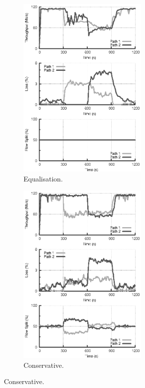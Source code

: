 \begin{figure}
    \begin{subfigure}[b]{.5\linewidth}
        \centering
        \includegraphics[width=2.5in]{figures/cate/two/equal}
        \caption{Equalisation.}\label{fig:twoequal}
    \end{subfigure}%
    \begin{subfigure}[b]{.5\linewidth}
        \centering
        \includegraphics[width=2.5in]{figures/cate/two/cons}
        \caption{Conservative.}\label{fig:twocons}
    \end{subfigure}%

    \vspace{10mm}


\end{figure}

